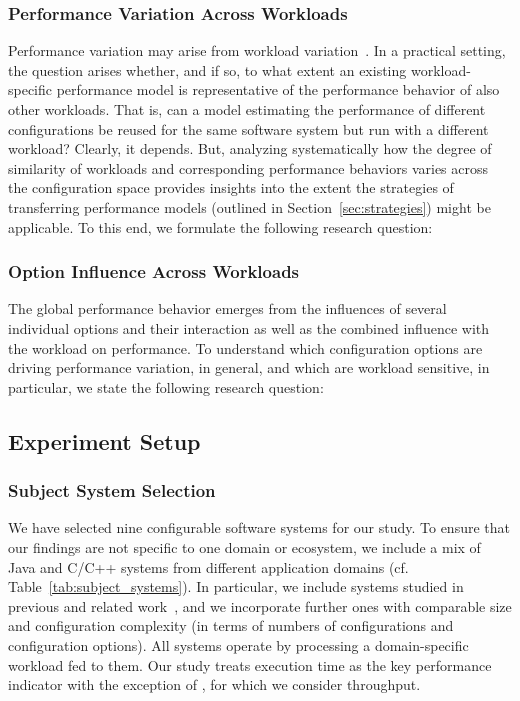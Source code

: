 {\subsubsection{Performance Variation Across Workloads}
Performance variation may arise from workload variation~\cite{benchmarking_book}. In a practical setting, the question arises whether, and if so, to what extent an existing workload-specific performance model is representative of the performance behavior of also other workloads. 
That is, can a model estimating the performance of different configurations be reused for the same software system but run with a different workload? 
Clearly, it depends. But, analyzing systematically how the degree of similarity of workloads and corresponding performance behaviors varies across the configuration space provides insights into the extent the strategies of transferring performance models (outlined in Section~\ref{sec:strategies}) might be applicable.
To this end, we formulate the following research question: 

\subsubsection{Option Influence Across Workloads}
The global performance behavior emerges from the influences of several individual options and their interaction as well as the combined influence with the workload on performance. To understand which configuration options are driving performance variation, in general, and which are workload sensitive, in particular, we state the following research question:


\subsection{Experiment Setup}\label{sec:setup}
\subsubsection{Subject System Selection}
{\color{black}
We have selected nine configurable software systems for our study. To ensure that our findings are not specific to one domain or ecosystem, we include a mix of Java and C/C++ systems from different application domains (cf. Table~\ref{tab:subject_systems}). In particular, we include systems studied in previous and related work~\cite{velez_2020_configcrusher_jase,weber_white_2021,alves_sampling_2020}, and we incorporate further ones with comparable size and configuration complexity (in terms of numbers of configurations and configuration options). All systems operate by processing a domain-specific workload fed to them. Our study treats execution time as the key performance indicator with the exception of \htwo, for which we consider throughput.

}}
